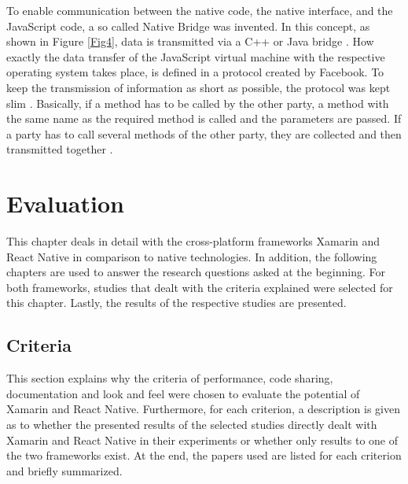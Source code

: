 \documentclass[Bachelor,BIF,english]{twbook}
\begin{document}
To enable communication between the native code, the native interface, and the JavaScript code, a so called Native Bridge was invented. In this concept, as shown in Figure \ref{Fig4}, data is transmitted via a C++ or Java bridge \cite[p.~28]{ZubaBernhard2017EdPb}. How exactly the data transfer of the JavaScript virtual machine with the respective operating system takes place, is defined in a protocol created by Facebook. To keep the transmission of information as short as possible, the protocol was kept slim \cite[p.~9-10]{Hansson_Vidhall_2016} \cite[p.~28]{ZubaBernhard2017EdPb}. Basically, if a method has to be called by the other party, a method with the same name as the required method is called and the parameters are passed. If a party has to call several methods of the other party, they are collected and then transmitted together \cite[p.~29]{ZubaBernhard2017EdPb}.

\newpage
\chapter{Evaluation}
This chapter deals in detail with the cross-platform frameworks Xamarin and React Native in comparison to native technologies. In addition, the following chapters are used to answer the research questions asked at the beginning. For both frameworks, studies that dealt with the criteria explained were selected for this chapter. Lastly, the results of the respective studies are presented.

\section{Criteria}
This section explains why the criteria of performance, code sharing, documentation and look and feel were chosen to evaluate the potential of Xamarin and React Native. Furthermore, for each criterion, a description is given as to whether the presented results of the selected studies directly dealt with Xamarin and React Native in their experiments or whether only results to one of the two frameworks exist. At the end, the papers used are listed for each criterion and briefly summarized.
\end{document}
